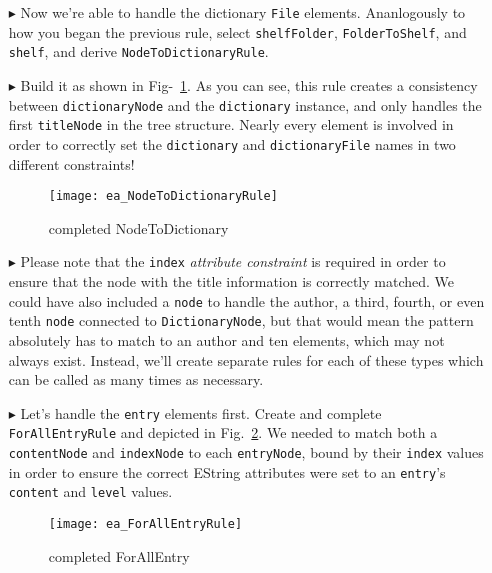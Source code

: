 \begin{itemize}
\newpage

\item[$\blacktriangleright$] Now we're able to handle the dictionary \texttt{File} elements. Ananlogously to how you began the previous rule, select
\texttt{shelfFolder}, \texttt{FolderToShelf}, and \texttt{shelf}, and derive \texttt{NodeToDictionaryRule}.

\item[$\blacktriangleright$] Build it as shown in Fig-~\ref{ea:NodeToDictionary_Complete}. As you can see, this rule creates a consistency between
\texttt{dictionaryNode} and the \texttt{dictionary} instance, and only handles the first \texttt{titleNode} in the tree structure. Nearly every element is
involved in order to correctly set the \texttt{dictionary} and \texttt{dictionaryFile} names in two different constraints!

\begin{figure}[htbp]
\begin{center}
  \texttt{[image: ea\_NodeToDictionaryRule]}
  \caption{completed NodeToDictionary}
  \label{ea:NodeToDictionary_Complete}
\end{center}
\end{figure}

\item[$\blacktriangleright$] Please note that the \texttt{index} \emph{attribute constraint} is required in order to ensure that the node with the title
information is correctly matched. We could have also included a \texttt{node} to handle the author, a third, fourth, or even tenth \texttt{node} connected to
\texttt{DictionaryNode}, but that would mean the pattern absolutely has to match to an author and ten elements, which may not always exist. Instead, we'll
create separate rules for each of these types which can be called as many times as necessary.

\item[$\blacktriangleright$] Let's handle the \texttt{entry} elements first. Create and complete \texttt{ForAllEntryRule} and depicted in
Fig.~\ref{ea:ForAllEntry_Complete}. We needed to match both a \texttt{contentNode} and \texttt{indexNode} to each \texttt{entryNode}, bound by their
\texttt{index} values in order to ensure the correct EString attributes were set to an \texttt{entry}'s \texttt{content} and \texttt{level} values.

\begin{figure}[htbp]
\begin{center}
  \texttt{[image: ea\_ForAllEntryRule]}
  \caption{completed ForAllEntry}
  \label{ea:ForAllEntry_Complete}
\end{center}
\end{figure}


\end{itemize}
